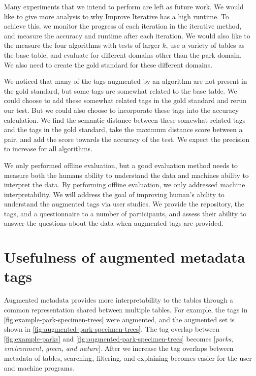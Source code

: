 Many experiments that we intend to perform are left as future work. We would like to give more analysis to why Improve Iterative has a high runtime. To achieve this, we monitor the progress of each iteration in the iterative method, and measure the accuracy and runtime after each iteration. We would also like to the measure the four algorithms with tests of larger $k$, use a variety of tables as the base table, and evaluate for different domains other than the park domain. We also need to create the gold standard for these different domains.

We noticed that many of the tags augmented by an algorithm are not present in the gold standard, but some tags are somewhat related to the base table. We could choose to add these somewhat related tags in the gold standard and rerun our test. But we could also choose to incorporate these tags into the accuracy calculation. We find the semantic distance between these somewhat related tags and the tags in the gold standard, take the maximum distance score between a pair, and add the score towards the accuracy of the test. We expect the precision to increase for all algorithms.

We only performed offline evaluation, but a good evaluation method needs to measure both the humans ability to understand the data and machines ability to interpret the data. By performing offline evaluation, we only addressed machine interpretability. We will address the goal of improving human's ability to understand the augmented tags via user studies. We provide the repository, the tags, and a questionnaire to a number of participants, and assess their ability to answer the questions about the data when augmented tags are provided.

\section{Usefulness of augmented metadata tags}
\label{sec:UsefulnessOfAugmentedMetadataTags}

Augmented metadata provides more interpretability to the tables through a common representation shared between multiple tables. For example, the tags in \autoref{fig:example-park-specimen-trees} were augmented, and the augmented set is shown in \autoref{fig:augmented-park-specimen-trees}. The tag overlap between \autoref{fig:example-parks} and \autoref{fig:augmented-park-specimen-trees} becomes [\textit{parks, environment, green, and nature}]. After we increase the tag overlaps between metadata of tables, searching, filtering, and explaining becomes easier for the user and machine programs.

